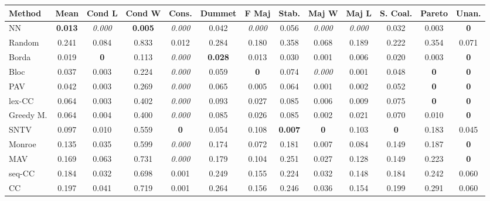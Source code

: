 \begin{tabular}{lcccccccccccc}
\toprule
Method & Mean & Cond L & Cond W & Cons. & Dummet & F Maj & Stab. & Maj W & Maj L & S. Coal. & Pareto & Unan. \\
\midrule
NN & \textbf{0.013} & \textit{0.000} & \textbf{0.005} & \textit{0.000} & 0.042 & \textit{0.000} & 0.056 & \textit{0.000} & \textit{0.000} & 0.032 & 0.003 & \textbf{0} \\
Random & 0.241 & 0.084 & 0.833 & 0.012 & 0.284 & 0.180 & 0.358 & 0.068 & 0.189 & 0.222 & 0.354 & 0.071 \\
Borda & 0.019 & \textbf{0} & 0.113 & \textit{0.000} & \textbf{0.028} & 0.013 & 0.030 & 0.001 & 0.006 & 0.020 & 0.003 & \cellcolor{green!25}\textbf{0} \\
Bloc & 0.037 & 0.003 & 0.224 & \textit{0.000} & 0.059 & \cellcolor{green!25}\textbf{0} & 0.074 & \textit{0.000} & 0.001 & 0.048 & \cellcolor{green!25}\textbf{0} & \cellcolor{green!25}\textbf{0} \\
PAV & 0.042 & 0.003 & 0.269 & \textit{0.000} & 0.065 & 0.005 & 0.064 & 0.001 & 0.002 & 0.052 & \cellcolor{green!25}\textbf{0} & \textbf{0} \\
lex-CC & 0.064 & 0.003 & 0.402 & \textit{0.000} & 0.093 & 0.027 & 0.085 & 0.006 & 0.009 & 0.075 & \textbf{0} & \textbf{0} \\
Greedy M. & 0.064 & 0.004 & 0.400 & \cellcolor{green!25}\textit{0.000} & 0.085 & 0.026 & 0.085 & 0.002 & 0.021 & \cellcolor{green!25}0.070 & 0.010 & \cellcolor{green!25}\textbf{0} \\
SNTV & 0.097 & 0.010 & 0.559 & \cellcolor{green!25}\textbf{0} & 0.054 & 0.108 & \textbf{0.007} & \cellcolor{green!25}\textbf{0} & 0.103 & \cellcolor{green!25}\textbf{0} & 0.183 & 0.045 \\
Monroe & 0.135 & 0.035 & 0.599 & \cellcolor{green!25}\textit{0.000} & 0.174 & 0.072 & 0.181 & 0.007 & 0.084 & 0.149 & 0.187 & \cellcolor{green!25}\textbf{0} \\
MAV & 0.169 & 0.063 & 0.731 & \textit{0.000} & 0.179 & 0.104 & 0.251 & 0.027 & 0.128 & 0.149 & 0.223 & \textbf{0} \\
seq-CC & 0.184 & 0.032 & 0.698 & 0.001 & 0.249 & 0.155 & 0.224 & 0.032 & 0.148 & 0.184 & 0.242 & 0.060 \\
CC & 0.197 & 0.041 & 0.719 & \cellcolor{green!25}0.001 & 0.264 & 0.156 & 0.246 & 0.036 & 0.154 & 0.199 & 0.291 & 0.060 \\
\bottomrule
\end{tabular}
